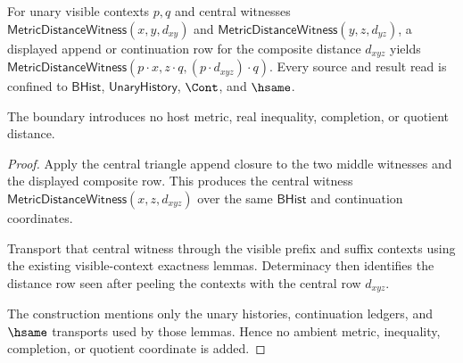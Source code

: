 \begin{theorem}
\label{thm:metricspace-visible-context-triangle-boundary}
For unary visible contexts $p,q$ and central witnesses
$\mathsf{MetricDistanceWitness}(x,y,d_{xy})$ and
$\mathsf{MetricDistanceWitness}(y,z,d_{yz})$, a displayed append or
continuation row for the composite distance $d_{xyz}$ yields
$\mathsf{MetricDistanceWitness}(p\cdot x,z\cdot q,(p\cdot d_{xyz})\cdot q)$.
Every source and result read is confined to $\mathsf{BHist}$,
$\mathsf{UnaryHistory}$, $\Cont$, and $\hsame$.

The boundary introduces no host metric, real inequality, completion, or
quotient distance.
\end{theorem}
\begin{proof}
Apply the central triangle append closure to the two middle witnesses and the
displayed composite row. This produces the central witness
$\mathsf{MetricDistanceWitness}(x,z,d_{xyz})$ over the same $\mathsf{BHist}$ and
continuation coordinates.

Transport that central witness through the visible prefix and suffix contexts
using the existing visible-context exactness lemmas. Determinacy then identifies
the distance row seen after peeling the contexts with the central row
$d_{xyz}$.

The construction mentions only the unary histories, continuation ledgers, and
$\hsame$ transports used by those lemmas. Hence no ambient metric, inequality,
completion, or quotient coordinate is added.
\end{proof}








